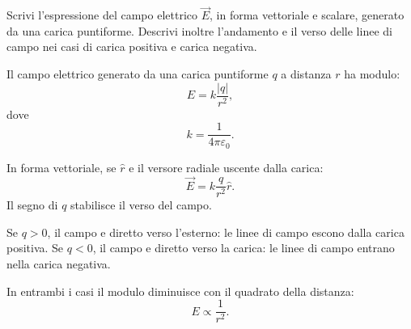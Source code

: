 
\begin{esercizio}
Scrivi l'espressione del campo elettrico \(\vec{E}\), in forma vettoriale e
scalare, generato da una carica puntiforme. Descrivi inoltre l'andamento e il
verso delle linee di campo nei casi di carica positiva e carica negativa.
\end{esercizio}

\begin{soluzione}
Il campo elettrico generato da una carica puntiforme \(q\) a distanza \(r\)
ha modulo:
\[
E=k\frac{|q|}{r^2},
\]
dove
\[
k=\frac{1}{4\pi\varepsilon_0}.
\]

In forma vettoriale, se \(\hat r\) e il versore radiale uscente dalla carica:
\[
\vec E=k\frac{q}{r^2}\hat r.
\]
Il segno di \(q\) stabilisce il verso del campo.

Se \(q>0\), il campo e diretto verso l'esterno: le linee di campo escono dalla
carica positiva. Se \(q<0\), il campo e diretto verso la carica: le linee di
campo entrano nella carica negativa.

In entrambi i casi il modulo diminuisce con il quadrato della distanza:
\[
E\propto \frac{1}{r^2}.
\]
\end{soluzione}

